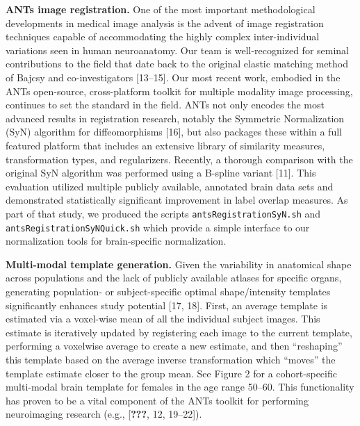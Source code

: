 \documentclass[11pt,]{article}
\begin{document}
\textbf{ANTs image registration.} One of the most important
methodological developments in medical image analysis is the advent of
image registration techniques capable of accommodating the highly
complex inter-individual variations seen in human neuroanatomy. Our team
is well-recognized for seminal contributions to the field that date back
to the original elastic matching method of Bajcsy and co-investigators
{[}13--15{]}. Our most recent work, embodied in the ANTs open-source,
cross-platform toolkit for multiple modality image processing, continues
to set the standard in the field. ANTs not only encodes the most
advanced results in registration research, notably the Symmetric
Normalization (SyN) algorithm for diffeomorphisms {[}16{]}, but also
packages these within a full featured platform that includes an
extensive library of similarity measures, transformation types, and
regularizers. Recently, a thorough comparison with the original SyN
algorithm was performed using a B-spline variant {[}11{]}. This
evaluation utilized multiple publicly available, annotated brain data
sets and demonstrated statistically significant improvement in label
overlap measures. As part of that study, we produced the scripts
\texttt{antsRegistrationSyN.sh} and \texttt{antsRegistrationSyNQuick.sh}
which provide a simple interface to our normalization tools for
brain-specific normalization.

\textbf{Multi-modal template generation.} Given the variability in
anatomical shape across populations and the lack of publicly available
atlases for specific organs, generating population- or subject-specific
optimal shape/intensity templates significantly enhances study potential
{[}17, 18{]}. First, an average template is estimated via a voxel-wise
mean of all the individual subject images. This estimate is iteratively
updated by registering each image to the current template, performing a
voxelwise average to create a new estimate, and then ``reshaping'' this
template based on the average inverse transformation which ``moves'' the
template estimate closer to the group mean. See Figure 2 for a
cohort-specific multi-modal brain template for females in the age range
50--60. This functionality has proven to be a vital component of the
ANTs toolkit for performing neuroimaging research (e.g.,
{[}\textbf{???}, 12, 19--22{]}).
\end{document}
